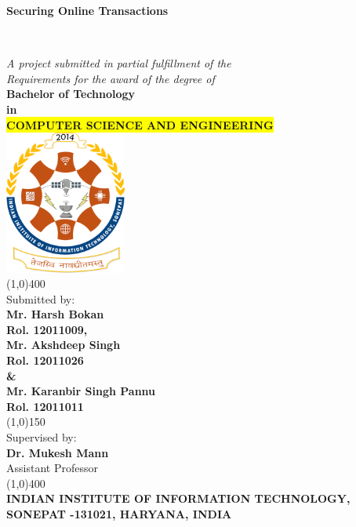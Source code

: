 \documentclass[12pt, oneside, a4paper]{article}
\begin{document}
\begin{titlepage}
\begin{center}
    \vspace{0.1cm}
    \begin{Large}\textbf{Securing Online Transactions}\end{Large}\\
    \vspace{1cm}\begin{large}
    \textit{A project submitted in partial fulfillment of the\\
    Requirements for the award of the degree of}\\
    \vspace{0.8cm}
    \textbf{Bachelor of Technology\\ in}\\
    \textbf{\colorbox{yellow}{COMPUTER SCIENCE AND ENGINEERING}}\\
    \vspace{0.3cm}
    \includegraphics[width=0.3\textwidth]{Clg_logo.png}\\
    \vspace{0.5cm}
    \line(1,0){400}\\\vspace{0.3cm}
    Submitted by:\\
    \textbf{Mr. Harsh Bokan\\Rol. 12011009,\\
    \vspace{0.2cm}
    Mr. Akshdeep Singh\\Rol. 12011026\\ \& \\
    Mr. Karanbir Singh Pannu\\Rol. 12011011}\\
    \vspace{0.4cm}
    \line(1,0){150}\\
    \vspace{0.4cm}
    Supervised by:\\
    \textbf{Dr. Mukesh Mann}\\
    Assistant Professor\\
    \line(1,0){400}\\
    \vspace{1cm}
    \textbf{INDIAN INSTITUTE OF INFORMATION TECHNOLOGY,\\
    SONEPAT -131021, HARYANA, INDIA}\\\end{large}
    \vspace{1cm}
\end{center}
\end{titlepage}
\end{document}
